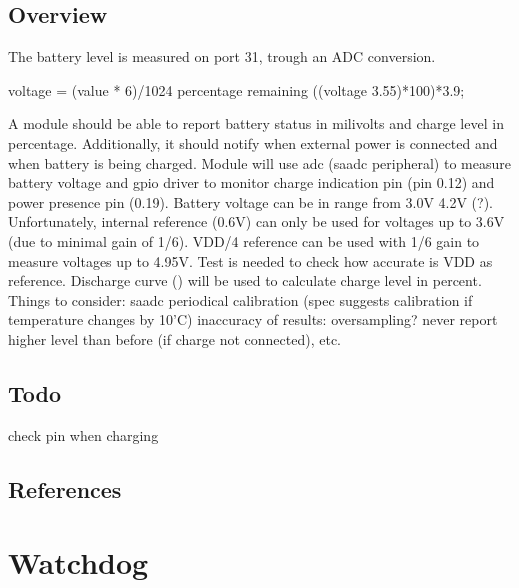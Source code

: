 \documentclass[letterpaper,10pt,english]{sphinxmanual}
\begin{document}
\subsection{Overview}
\label{\detokenize{drivers/battery:overview}}
The battery level is measured on port 31, trough an ADC conversion.

voltage = (value * 6)/1024
percentage remaining  ((voltage \sphinxhyphen{} 3.55)*100)*3.9;

A module should be able to report battery status in milivolts and charge level in percentage. Additionally, it should notify when external power is connected and when battery is being charged.
Module will use adc (saadc peripheral) to measure battery voltage and gpio driver to monitor charge indication pin (pin 0.12) and power presence pin (0.19).
Battery voltage can be in range from 3.0V \sphinxhyphen{} 4.2V (?). Unfortunately, internal reference (0.6V) can only be used for voltages up to 3.6V (due to minimal gain of 1/6). VDD/4 reference can be used with 1/6 gain to measure voltages up to 4.95V. Test is needed to check how accurate is VDD as reference.
Discharge curve () will be used to calculate charge level in percent.
Things to consider:
saadc periodical calibration (spec suggests calibration if temperature changes by 10’C)
inaccuracy of results: oversampling? never report higher level than before (if charge not connected), etc.


\subsection{Todo}
\label{\detokenize{drivers/battery:todo}}
check pin when charging


\subsection{References}
\label{\detokenize{drivers/battery:references}}


\section{Watchdog}
\label{\detokenize{drivers/watchdog:watchdog}}\label{\detokenize{drivers/watchdog::doc}}
\begin{sphinxVerbatim}[commandchars=\\\{\}]
\end{sphinxVerbatim}
\end{document}
